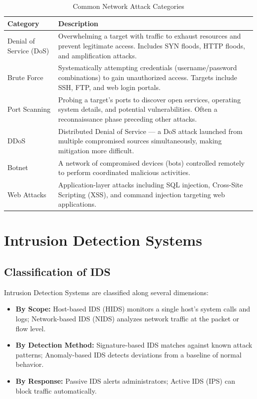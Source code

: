 \documentclass[12pt,a4paper,twoside]{report}
\begin{document}
\begin{table}[H]
\centering
\caption{Common Network Attack Categories}
\begin{tabularx}{\textwidth}{lX}
\toprule
\textbf{Category} & \textbf{Description} \\
\midrule
Denial of Service (DoS) & Overwhelming a target with traffic to exhaust resources and prevent legitimate access. Includes SYN floods, HTTP floods, and amplification attacks. \\
Brute Force & Systematically attempting credentials (username/password combinations) to gain unauthorized access. Targets include SSH, FTP, and web login portals. \\
Port Scanning & Probing a target's ports to discover open services, operating system details, and potential vulnerabilities. Often a reconnaissance phase preceding other attacks. \\
DDoS & Distributed Denial of Service — a DoS attack launched from multiple compromised sources simultaneously, making mitigation more difficult. \\
Botnet & A network of compromised devices (bots) controlled remotely to perform coordinated malicious activities. \\
Web Attacks & Application-layer attacks including SQL injection, Cross-Site Scripting (XSS), and command injection targeting web applications. \\
\bottomrule
\end{tabularx}
\end{table}

\section{Intrusion Detection Systems}

\subsection{Classification of IDS}

Intrusion Detection Systems are classified along several dimensions:

\begin{itemize}
    \item \textbf{By Scope:} Host-based IDS (HIDS) monitors a single host's system calls and logs; Network-based IDS (NIDS) analyzes network traffic at the packet or flow level.
    \item \textbf{By Detection Method:} Signature-based IDS matches against known attack patterns; Anomaly-based IDS detects deviations from a baseline of normal behavior.
    \item \textbf{By Response:} Passive IDS alerts administrators; Active IDS (IPS) can block traffic automatically.
\end{itemize}
\end{document}
